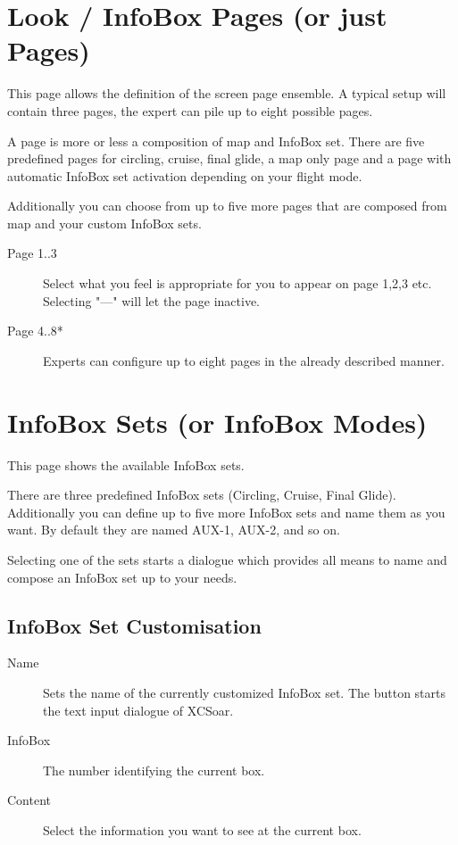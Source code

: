 \section{Look / InfoBox Pages (or just Pages)}

This page allows the definition of the screen page ensemble. A typical setup 
will contain three pages, the expert can pile up to eight possible pages.

A page is more or less a composition of map and InfoBox set. There are five 
predefined pages for circling, cruise, final glide, a map only page and a 
page with automatic InfoBox set activation depending on your flight mode.

Additionally you can choose from up to five more pages that are composed from map 
and your custom InfoBox sets.  

\begin{description}
\item[Page 1..3]  Select what you feel is appropriate for you to appear on page 1,2,3 etc. 
  Selecting "---" will let the page inactive.
\item[Page 4..8*]  Experts can configure up to eight pages in the already 
  described manner.
\end{description}


\section{InfoBox Sets (or InfoBox Modes)}\label{sec:infobox_sets}

This page shows the available InfoBox sets.

There are three predefined InfoBox sets (Circling, Cruise, Final Glide). Additionally you 
can define up to five more InfoBox sets and name them as you want.   By default they 
are named AUX-1, AUX-2, and so on.

Selecting one of the sets starts a dialogue which provides all means to name and 
compose an InfoBox set up to your needs.

\subsection*{InfoBox Set Customisation}

\begin{description}
\item[Name]  Sets the name of the currently customized InfoBox set. The 
  button starts the text input dialogue of XCSoar.
\item[InfoBox]  The number identifying the current box.
\item[Content]  Select the information you want to see at the current box.
\end{description}

